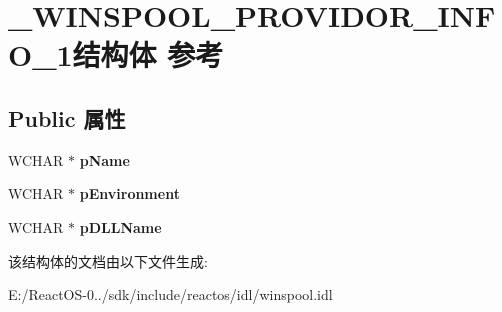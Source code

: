 \hypertarget{struct___w_i_n_s_p_o_o_l___p_r_o_v_i_d_o_r___i_n_f_o__1}{}\section{\+\_\+\+W\+I\+N\+S\+P\+O\+O\+L\+\_\+\+P\+R\+O\+V\+I\+D\+O\+R\+\_\+\+I\+N\+F\+O\+\_\+1结构体 参考}
\label{struct___w_i_n_s_p_o_o_l___p_r_o_v_i_d_o_r___i_n_f_o__1}
\subsection*{Public 属性}
\begin{DoxyCompactItemize}
\item 
\mbox{\label{struct___w_i_n_s_p_o_o_l___p_r_o_v_i_d_o_r___i_n_f_o__1_a941e599c46130f9126aa28b089394fc1}} 
W\+C\+H\+AR $\ast$ {\bfseries p\+Name}
\item 
\mbox{\label{struct___w_i_n_s_p_o_o_l___p_r_o_v_i_d_o_r___i_n_f_o__1_af7ae8dba88003941fdb1d22eb93a80e6}} 
W\+C\+H\+AR $\ast$ {\bfseries p\+Environment}
\item 
\mbox{\label{struct___w_i_n_s_p_o_o_l___p_r_o_v_i_d_o_r___i_n_f_o__1_aa16f4d28b088b2c475df0c2d9dfcd56d}} 
W\+C\+H\+AR $\ast$ {\bfseries p\+D\+L\+L\+Name}
\end{DoxyCompactItemize}


该结构体的文档由以下文件生成\+:\begin{DoxyCompactItemize}
\item 
E\+:/\+React\+O\+S-\/0../sdk/include/reactos/idl/winspool.\+idl\end{DoxyCompactItemize}
